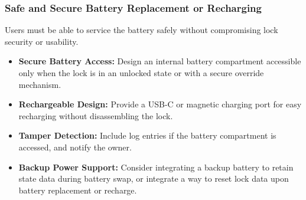 \subsubsection*{Safe and Secure Battery Replacement or Recharging}

Users must be able to service the battery safely without compromising lock security or usability.

\begin{itemize}
  \item \textbf{Secure Battery Access:} Design an internal battery compartment accessible only when the lock is in an unlocked state or with a secure override mechanism.
  \item \textbf{Rechargeable Design:} Provide a USB-C or magnetic charging port for easy recharging without disassembling the lock.
  \item \textbf{Tamper Detection:} Include log entries if the battery compartment is accessed, and notify the owner.
  \item \textbf{Backup Power Support:} Consider integrating a backup battery to retain state data during battery swap, or integrate a way to reset lock data upon battery replacement or recharge.
\end{itemize}
